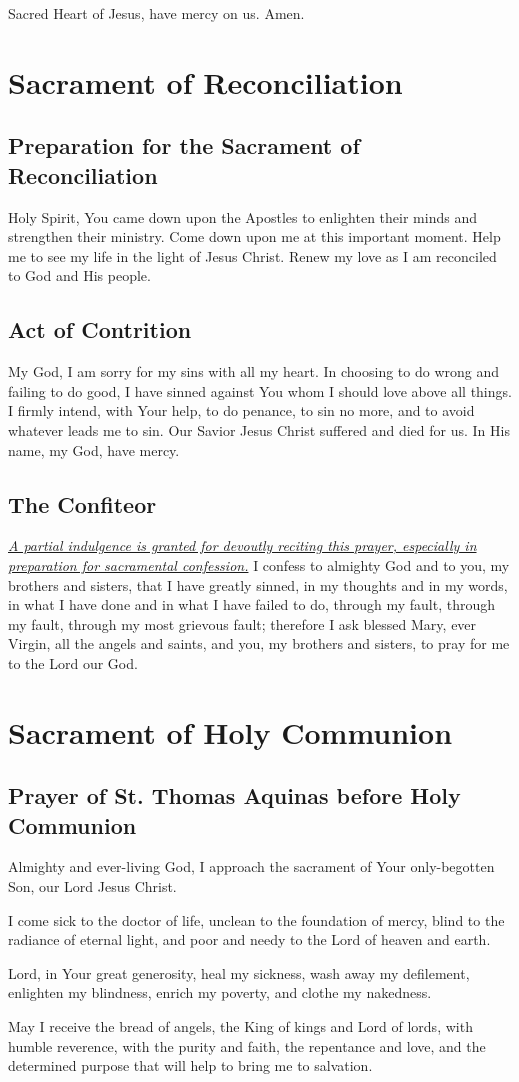 \documentclass[12pt]{article}
\newcommand{\prayersection}[1]{\section{#1}}
\newcommand{\prayertitle}[1]{\subsection{#1}}
\newcommand{\indulgencedprayertitle}[1]{\prayertitle{#1 \protect\kreuz}}
\newcommand{\note}[1]{{\small{\textsl{#1}}}\newline}
\newcommand{\linkednote}[2]{\hyperlink{#1}{\note{#2}}}
\begin{document}
Sacred Heart of Jesus, have mercy on us. Amen.

\newpage

\prayersection{Sacrament of Reconciliation}
\prayertitle{Preparation for the Sacrament of Reconciliation}
Holy Spirit,
You came down upon the Apostles to enlighten their minds and strengthen their ministry.
Come down upon me at this important moment.
Help me to see my life in the light of Jesus Christ.
Renew my love as I am reconciled to God and His people.

\prayertitle{Act of Contrition}
My God,
I am sorry for my sins with all my heart.
In choosing to do wrong and failing to do good, I have sinned against You whom I should love above all things.
I firmly intend, with Your help, to do penance, to sin no more, and to avoid whatever leads me to sin.
Our Savior Jesus Christ suffered and died for us.
In His name, my God, have mercy.

\indulgencedprayertitle{The Confiteor}
\linkednote{grant9}{A partial indulgence is granted for devoutly reciting this prayer, especially in preparation for sacramental confession.}
I confess to almighty God and to you, my brothers and sisters, that I have greatly sinned, in my thoughts and in my words, in what I have done and in what I have failed to do, through my fault, through my fault, through my most grievous fault;
therefore I ask blessed Mary, ever Virgin, all the angels and saints, and you, my brothers and sisters, to pray for me to the Lord our God.

\newpage

\prayersection{Sacrament of Holy Communion}
\prayertitle{Prayer of St. Thomas Aquinas before Holy Communion}
Almighty and ever-living God, I approach the sacrament of Your only-begotten Son, our Lord Jesus Christ.

I come sick to the doctor of life, unclean to the foundation of mercy, blind to the radiance of eternal light, and poor and needy to the Lord of heaven and earth.

Lord, in Your great generosity, heal my sickness, wash away my defilement, enlighten my blindness, enrich my poverty, and clothe my nakedness.

May I receive the bread of angels, the King of kings and Lord of lords, with humble reverence, with the purity and faith, the repentance and love, and the determined purpose that will help to bring me to salvation.
\end{document}
